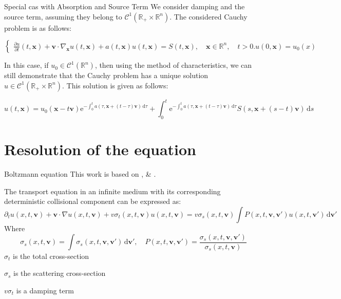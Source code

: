 \documentclass[aspectratio=1610]{beamer}
\newcommand{\bm}[1]{\symbf{#1}}
\newcommand{\di}{\ensuremath{\, \mathrm{d}}}
\newcommand{\e}{\ensuremath{\mathrm{e}}}
\def\\{}%
\begin{document}
\begin{frame}{Special cas with Absorption and Source Term}
We consider damping and the source term, assuming they belong to $\mathcal{C}^1(\mathbb{R}_+ \times \mathbb{R}^n)$. The considered Cauchy problem is as follows:

	
\[
\begin{cases}
\frac{\partial u}{\partial t}(t,\bm{x})+\bm{v} \cdot \nabla_{\bm{x}} u(t,\bm{x}) + a(t,\bm{x})u(t,\bm{x}) = S(t,\bm{x}), \quad \bm{x} \in \mathbb{R}^n, \quad t>0.\\
u(0,\bm{x}) = u_{0}(x)
\end{cases}
\]

In this case, if $u_0 \in \mathcal{C}^1(\mathbb{R}^n)$, then using the method of characteristics, we can still demonstrate that the Cauchy problem has a unique solution $u \in \mathcal{C}^1(\mathbb{R}_+ \times \mathbb{R}^n)$. This solution is given as follows:\\

\begin{equation*}
u(t,\bm{x}) = u_0(\bm{x}-t\bm{v}) \e^{-\int_0 ^t a(\tau, \bm{x}+(t-\tau)\bm{v}) \di \tau} + \int_0^t  \e^{-\int_0 ^t a(\tau, \bm{x}+(t-\tau)\bm{v})\di\tau} S(s,\bm{x}+(s-t)\bm{v}) \di s
\end{equation*}

    
\end{frame}



\section{Resolution of the equation}
\begin{frame}{Boltzmann equation}
    This work is based on \cite{noauthor_transport_2018}, \cite{poette:tel-02288678} \& \cite{lapeyre_methodes_1998}.
    
    The transport equation in an infinite medium with its corresponding deterministic collisional component can be expressed as:
 \begin{equation*}
\partial_t u(x,t,\bm{v}) + \bm{v} \cdot \nabla u(x,t,\bm{v}) + v\sigma_t (x,t,\bm{v})u(x,t,\bm{v})= v\sigma_s(x,t,\bm{v}) \! \int P(x,t,\bm{v},\bm{v}')u(x,t,\bm{v}') \di\bm{v}' \label{ref11}
 \end{equation*}
Where 
\begin{equation*}
   \sigma_s (x,t,\bm{v})= \int \sigma_s (x,t,\bm{v},\bm{v}') \di \bm{v}', \quad  P (x,t,\bm{v},\bm{v}')=
\frac{\sigma_s (x,t,\bm{v},\bm{v}')}{\sigma_s (x,t,\bm{v})}
\end{equation*}
$\sigma_t$ is the total cross-section

$\sigma_s$ is the scattering cross-section

$v \sigma_t$ is a damping term
\end{frame}
\end{document}
